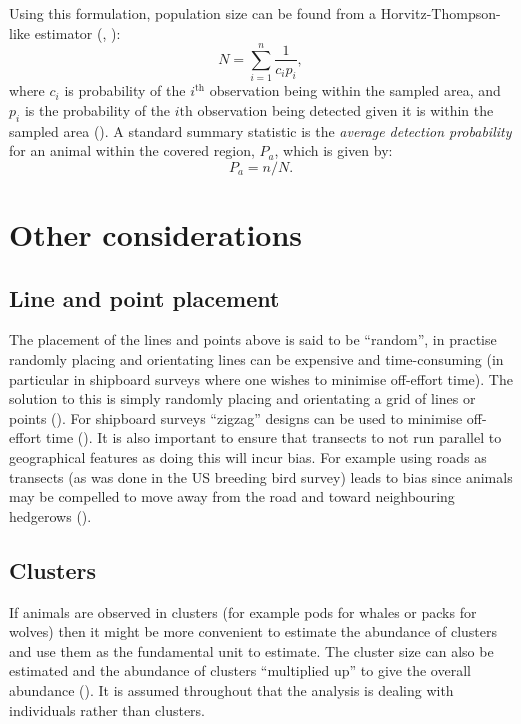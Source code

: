 \label{intro-ds-pop-size}
Using this formulation, population size can be found from a Horvitz-Thompson-like estimator (\cite[pp. 53-56]{thompson}, \cite[p. 23]{ADS}):
\begin{equation}
N = \sum_{i=1}^n \frac{1}{c_i p_i},
\label{HT-ds-est}
\end{equation}
where $c_i$ is probability of the $i^\text{th}$ observation being within the sampled area, and $p_i$ is the probability of the $i\text{th}$ observation being detected given it is within the sampled area (\cite[p. 38]{ADS}).  A standard summary statistic is the \textit{average detection probability} for an animal within the covered region, $P_a$, which is given by:
\begin{equation*}
P_a = n/N.
\end{equation*}

\section{Other considerations}

\subsection{Line and point placement}
The placement of the lines and points above is said to be ``random'', in practise randomly placing and orientating lines can be expensive and time-consuming (in particular in shipboard surveys where one wishes to minimise off-effort time). The solution to this is simply randomly placing and orientating a grid of lines or points (\cite[p. 2]{IDS}). For shipboard surveys ``zigzag'' designs can be used to minimise off-effort time (\cite{strindberg04}). It is also important to ensure that transects to not run parallel to geographical features as doing this will incur bias. For example using roads as transects (as was done in the US breeding bird survey) leads to bias since animals may be compelled to move away from the road and toward neighbouring hedgerows (\cite[p. 18]{IDS}).

\subsection{Clusters}
If animals are observed in clusters (for example pods for whales or packs for wolves) then it might be more convenient to estimate the abundance of clusters and use them as the fundamental unit to estimate. The cluster size can also be estimated and the abundance of clusters ``multiplied up'' to give the overall abundance (\cite[p. 13]{IDS}). It is assumed throughout that the analysis is dealing with individuals rather than clusters.


